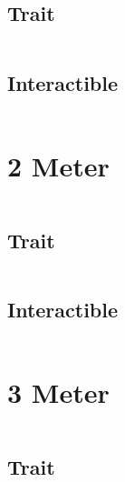 \documentclass[main.tex]{subfiles}
\begin{document}
\begin{lstlisting}[language=FG]
\end{lstlisting}

\subsection{Trait}

\begin{lstlisting}[language=FG]
\end{lstlisting}


\subsection{Interactible}
\begin{lstlisting}[language=FG]

\end{lstlisting}

\section{2 Meter}


\begin{lstlisting}[language=FG]
\end{lstlisting}

\subsection{Trait}

\begin{lstlisting}[language=FG]
\end{lstlisting}


\subsection{Interactible}
\begin{lstlisting}[language=FG]

\end{lstlisting}

\section{3 Meter}


\begin{lstlisting}[language=FG]
\end{lstlisting}

\subsection{Trait}
\end{document}
